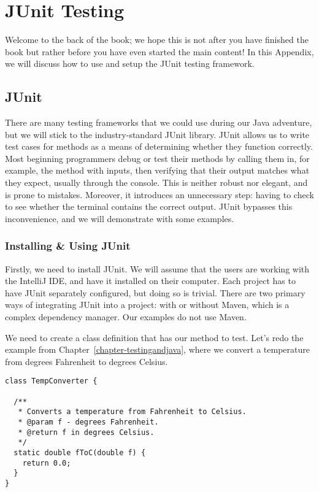 \appendix
\chapter{JUnit Testing}
\label{appendix-junit} %

Welcome to the back of the book; we hope this is not after you have finished the book but rather before you have even started the main content! 
In this Appendix, we will discuss how to use and setup the JUnit testing framework.

\section{JUnit}

There are many testing frameworks that we could use during our Java adventure, but we will stick to the industry-standard JUnit library. 
JUnit allows us to write test cases for methods as a means of determining whether they function correctly. 
Most beginning programmers debug or test their methods by calling them in, for example, the  method with inputs, then verifying that their output matches what they expect, usually through the console. 
This is neither robust nor elegant, and is prone to mistakes. 
Moreover, it introduces an unnecessary step: having to check to see whether the terminal contains the correct output.
JUnit bypasses this inconvenience, and we will demonstrate with some examples.

\subsection{Installing \& Using JUnit}

Firstly, we need to install JUnit. 
We will assume that the users are working with the IntelliJ IDE, and have it installed on their computer. 
Each project has to have JUnit separately configured, but doing so is trivial. 
There are two primary ways of integrating JUnit into a project: with or without Maven, which is a complex dependency manager. 
Our examples do not use Maven.

We need to create a class definition that has our method to test. 
Let's redo the example from Chapter~\ref{chapter-testingandjava}, where we convert a temperature from degrees Fahrenheit to degrees Celsius.

\begin{lstlisting}[language=MyJava]
class TempConverter {

  /**
   * Converts a temperature from Fahrenheit to Celsius.
   * @param f - degrees Fahrenheit.
   * @return f in degrees Celsius.
   */
  static double fToC(double f) {
    return 0.0;
  }
}
\end{lstlisting}

